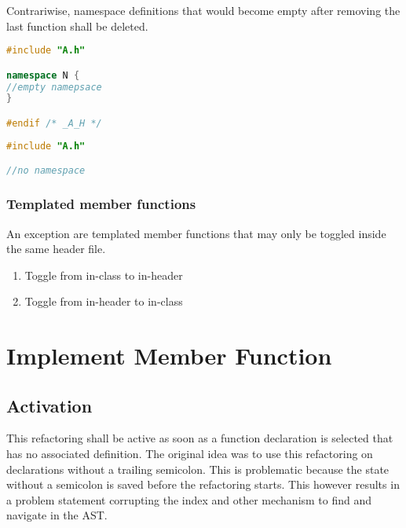 Contrariwise, namespace definitions that would become empty after removing the 
last function shall be deleted.

\vspace{0.5cm}
\begin{minipage}{.48\textwidth}
\lstset{xrightmargin=0.5cm}
\begin{lstlisting}[caption={A.cpp, empty namespace},
label={delnamespace1}, language=C++]
#include "A.h"

namespace N {
//empty namepsace
}

#endif /* _A_H */
\end{lstlisting}
\end{minipage}%
\begin{minipage}{.48\textwidth}
\lstset{xleftmargin=0.5cm}
\begin{lstlisting}[caption={A.cpp, removed empty namepsace},
label={delnamespace2},language=C++]
#include "A.h"

//no namespace
\end{lstlisting}
\end{minipage}


\subsubsection{Templated member functions}

An exception are templated member functions that may only be toggled inside the 
same header file.
\begin{enumerate}
\item Toggle from in-class to in-header
\item Toggle from in-header to in-class
\end{enumerate}


\section{Implement Member Function}


\subsection{Activation}
This refactoring shall be active as soon as a function declaration is selected 
that has no associated definition. The original idea was to use this
refactoring on declarations without a trailing semicolon. This is problematic
because the state without a semicolon is saved before the refactoring starts.
This however results in a problem statement corrupting the index and other
mechanism to find and navigate in the AST.

